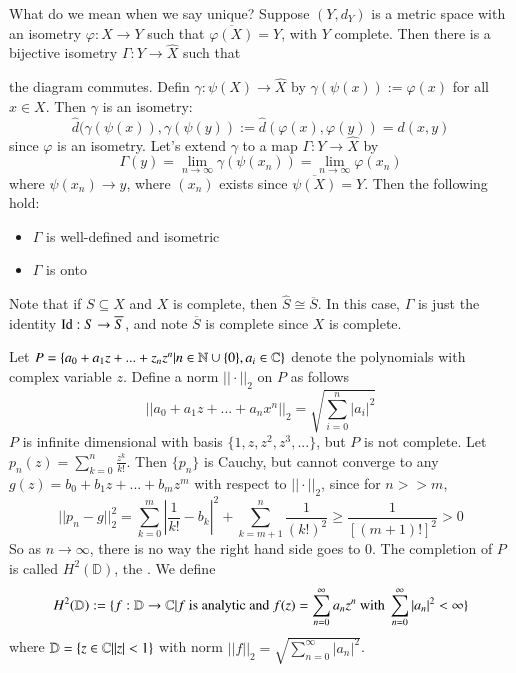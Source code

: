 What do we mean when we say unique? Suppose $(Y,d_Y)$ is a metric space with an isometry $\varphi:X\rightarrow Y$ such that $\overline{\varphi(X)} = Y$, with $Y$ complete. Then there is a bijective isometry $\Gamma:Y\rightarrow \hat{X}$ such that 
\begin{center}
\end{center}
the diagram commutes. Defin $\gamma:\psi(X)\rightarrow \hat{X}$ by $\gamma(\psi(x)) := \varphi(x)$ for all $x \in X$. Then $\gamma$ is an isometry: $$\hat{d}(\gamma(\psi(x)),\gamma(\psi(y)) := \hat{d}(\varphi(x),\varphi(y)) = d(x,y)$$ since $\varphi$ is an isometry. Let's extend $\gamma$ to a map $\Gamma:Y\rightarrow \hat{X}$ by $$\Gamma(y) = \lim\limits_{n\rightarrow \infty}\gamma(\psi(x_n)) = \lim\limits_{n\rightarrow \infty}\varphi(x_n)$$ where $\psi(x_n)\rightarrow y$, where $(x_n)$ exists since $\overline{\psi(X)} = Y$. Then the following hold: \begin{itemize}
    \item $\Gamma$ is well-defined and isometric
    \item $\Gamma$ is onto
\end{itemize}

Note that if $S \subseteq X$ and $X$ is complete, then $\hat{S} \cong \overline{S}$. In this case, $\Gamma$ is just the identity $\operatorname{Id}:S\rightarrow \overline{S}$, and note $\overline{S}$ is complete since $X$ is complete. 

\begin{example}
    Let $P = \{a_0 +a_1z+...+z_nz^n\vert n \in \mathbb N\cup\{0\},a_i \in \mathbb C\}$ denote the polynomials with complex variable $z$. Define a norm $||\cdot||_2$ on $P$ as follows $$||a_0+a_1z+...+a_nx^n||_2 = \sqrt{\sum_{i=0}^n|a_i|^2}$$ $P$ is infinite dimensional with basis $\{1,z,z^2,z^3,...\}$, but $P$ is not complete. Let $p_n(z) = \sum_{k=0}^n\frac{z^k}{k!}$. Then $\{p_n\}$ is Cauchy, but cannot converge to any $g(z) = b_0+b_1z+...+b_mz^m$ with respect to $||\cdot ||_2$, since for $n >> m$, $$||p_n-g||_2^2 = \sum_{k=0}^m\left|\frac{1}{k!}-b_k\right|^2 + \sum_{k=m+1}^n\frac{1}{(k!)^2} \geq\frac{1}{[(m+1)!]^2} > 0$$ So as $n\rightarrow \infty$, there is no way the right hand side goes to $0$. The completion of $P$ is called $H^2(\mathbb{D})$, the . We define $$H^2(\mathbb{D}) := \{f:\mathbb{D}\rightarrow \mathbb C\vert f\text{ is analytic and }f(z) = \sum_{n=0}^{\infty}a_nz^n\text{ with }\sum_{n=0}^{\infty}|a_n|^2 < \infty\}$$ where $\mathbb{D} = \{z \in \mathbb C\vert |z| < 1\}$ with norm $||f||_2 = \sqrt{\sum_{n=0}^{\infty}|a_n|^2}$.
\end{example}

